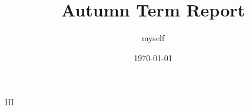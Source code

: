 \documentclass[a4paper, 12pt]{article}
\begin{document}
\title{Autumn Term Report}
\author{myself}
\date{\today}
\maketitle

  HI
\cite{paper}


\end{document}
